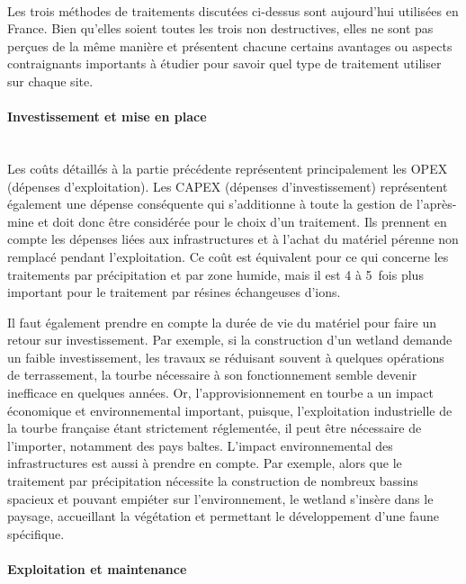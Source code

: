 \documentclass{article}
\begin{document}
\paragraph{} Les trois méthodes de traitements discutées ci-dessus sont aujourd’hui utilisées en France. Bien qu’elles soient toutes les trois non destructives, elles ne sont pas perçues de la même manière et présentent chacune certains avantages ou aspects contraignants importants à étudier pour savoir quel type de traitement utiliser sur chaque site.

\paragraph{Investissement et mise en place \\ \\}

Les coûts détaillés à la partie précédente représentent principalement les OPEX (dépenses d’exploitation). Les CAPEX (dépenses d’investissement) représentent également une dépense conséquente qui s'additionne à toute la gestion de l’après-mine et doit donc être considérée pour le choix d'un traitement. Ils prennent en compte les dépenses liées aux infrastructures et à l’achat du matériel pérenne non remplacé pendant l’exploitation. Ce coût est équivalent pour ce qui concerne les traitements par précipitation et par zone humide, mais il est 4 à 5~fois plus important pour le traitement par résines échangeuses d’ions.

Il faut également prendre en compte la durée de vie du matériel pour faire un retour sur investissement. Par exemple, si la construction d’un wetland demande un faible investissement, les travaux se réduisant souvent à quelques opérations de terrassement, la tourbe nécessaire à son fonctionnement semble devenir inefficace en quelques années. Or, l’approvisionnement en tourbe a un impact économique et environnemental important, puisque, l’exploitation industrielle de la tourbe française étant strictement réglementée, il peut être nécessaire de l’importer, notamment des pays baltes. L’impact environnemental des infrastructures est aussi à prendre en compte. Par exemple, alors que le traitement par précipitation nécessite la construction de nombreux bassins spacieux et pouvant empiéter sur l’environnement, le wetland s’insère dans le paysage, accueillant la végétation et permettant le développement d’une faune spécifique.

\paragraph{Exploitation et maintenance \\ \\}
\end{document}
